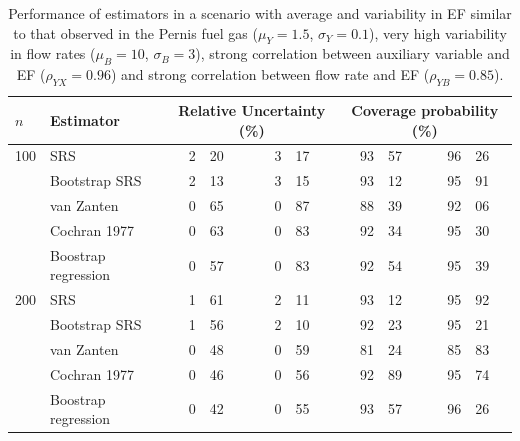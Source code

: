 \begin{table}
	\caption{Performance of estimators in a scenario with average and variability in EF similar to that observed in the Pernis fuel gas ($\mu_Y=1.5$, $\sigma_Y=0.1$), very high variability in flow rates ($\mu_B=10$, $\sigma_B=3$), strong correlation between auxiliary variable and EF ($\rho_{YX}=0.96$) and strong correlation between flow rate and EF ($\rho_{YB}=0.85$).}
	\begin{tabular}{l l r@{.}l@{ - }r@{.}l r@{.}l@{ - }r@{.}l}
		\hline
		$n$ & Estimator & \multicolumn{4}{c}{Relative Uncertainty (\%)} & \multicolumn{4}{c}{Coverage probability (\%)} \\
		\hline 
		100 & SRS 		 		& 2&20&3&17 & 93&57&96&26 \\
		    & Bootstrap SRS 	& 2&13&3&15 & 93&12&95&91 \\
		    & van Zanten   		& 0&65&0&87 & 88&39&92&06 \\
		    & Cochran 1977 		& 0&63&0&83 & 92&34&95&30 \\
		    & Boostrap regression & 0&57&0&83 & 92&54&95&39 \\
		\cline{2-10}
		200 & SRS 		 		& 1&61&2&11 & 93&12&95&92 \\
		    & Bootstrap SRS 	& 1&56&2&10 & 92&23&95&21 \\
		    & van Zanten   		& 0&48&0&59 & 81&24&85&83 \\
		    & Cochran 1977 		& 0&46&0&56 & 92&89&95&74 \\
		    & Boostrap regression & 0&42&0&55 & 93&57&96&26 \\
		\hline
	\end{tabular}\label{tab:batch3}
\end{table}


